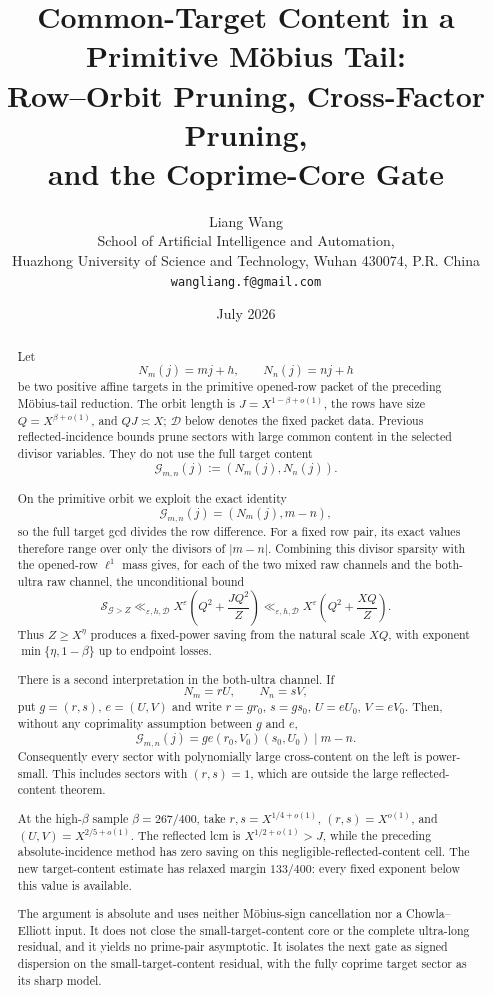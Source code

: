 \documentclass[11pt]{article}
\title{\textbf{Common-Target Content in a Primitive M\"obius Tail:}\\
\textbf{Row--Orbit Pruning, Cross-Factor Pruning,}\\
\textbf{and the Coprime-Core Gate}}
\author{Liang Wang\\
\small School of Artificial Intelligence and Automation,\\[-0.2em]
\small Huazhong University of Science and Technology, Wuhan 430074, P.R. China\\
\small \texttt{wangliang.f@gmail.com}}
\date{July 2026}
\theoremstyle{definition}
\theoremstyle{remark}
\newcommand{\eps}{\varepsilon}
\newcommand{\cG}{\mathcal G}
\newcommand{\cS}{\mathcal S}
\begin{document}
\maketitle

\begin{abstract}
Let
\[
 N_m(j)=mj+h,\qquad N_n(j)=nj+h
\]
be two positive affine targets in the primitive opened-row packet of
the preceding M\"obius-tail reduction.  The orbit length is
$J=X^{1-\beta+o(1)}$, the rows have size
$Q=X^{\beta+o(1)}$, and $QJ\asymp X$; $\mathscr D$ below denotes the
fixed packet data.  Previous reflected-incidence
bounds prune sectors with large common content in the selected
divisor variables.  They do not use the full target content
\[
 \cG_{m,n}(j):=(N_m(j),N_n(j)).
\]

On the primitive orbit we exploit the exact identity
\[
 \cG_{m,n}(j)=(N_m(j),m-n),
\]
so the full target gcd divides the row difference.  For a fixed row
pair, its exact values therefore range over only the divisors of
$|m-n|$.  Combining this divisor sparsity with the opened-row
$\ell^1$ mass gives, for each of the two mixed raw channels and the
both-ultra raw channel, the unconditional
bound
\[
 \cS_{\cG>Z}
 \ll_{\eps,h,\mathscr D}X^\eps
 \left(Q^2+\frac{JQ^2}{Z}\right)
 \ll_{\eps,h,\mathscr D}X^\eps
 \left(Q^2+\frac{XQ}{Z}\right).
\]
Thus $Z\ge X^\eta$ produces a fixed-power saving from the natural
scale $XQ$, with exponent
$\min\{\eta,1-\beta\}$ up to endpoint losses.

There is a second interpretation in the both-ultra channel.  If
\[
 N_m=rU,\qquad N_n=sV,
\]
put $g=(r,s)$, $e=(U,V)$ and write
$r=gr_0$, $s=gs_0$, $U=eU_0$, $V=eV_0$.  Then, without any
coprimality assumption between $g$ and $e$,
\[
 \cG_{m,n}(j)
 =ge(r_0,V_0)(s_0,U_0)\mid m-n.
\]
Consequently every sector with polynomially large cross-content
on the left is power-small.  This includes sectors with
$(r,s)=1$, which are outside the large reflected-content theorem.

At the high-$\beta$ sample $\beta=267/400$, take
$r,s=X^{1/4+o(1)}$, $(r,s)=X^{o(1)}$, and
$(U,V)=X^{2/5+o(1)}$.  The reflected lcm is
$X^{1/2+o(1)}>J$, while the preceding absolute-incidence method has
zero saving on this negligible-reflected-content cell.  The new
target-content estimate
has relaxed margin $133/400$: every fixed exponent below this value is
available.

The argument is absolute and uses neither M\"obius-sign cancellation
nor a Chowla--Elliott input.  It does not close the small-target-content
core or the complete ultra-long residual, and it yields no prime-pair
asymptotic.  It isolates the next gate as signed dispersion on the
small-target-content residual, with the fully coprime target sector as
its sharp model.
\end{abstract}
\end{document}
